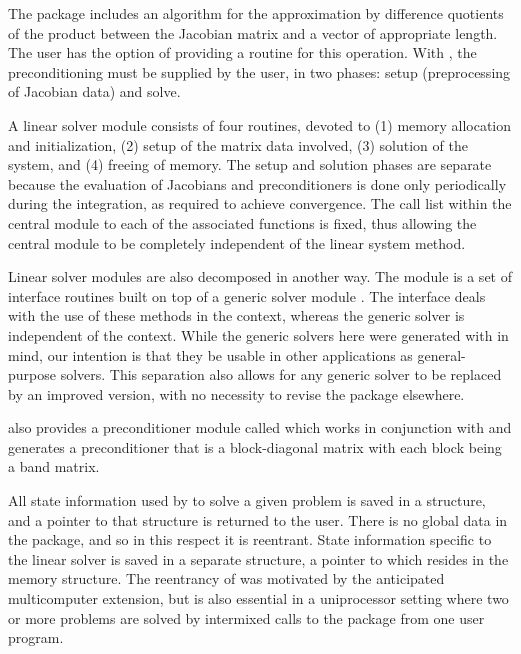 The {\kinspgmr} package includes an algorithm for the approximation
by difference quotients of the product between the Jacobian matrix and
a vector of appropriate length. The user has the option of providing
a routine for this operation.
With  {\kinspgmr},
the preconditioning must be supplied by the user, in two phases:
setup (preprocessing of Jacobian data) and solve.

A {\kinsol} linear solver module consists of four routines, devoted to (1)
memory allocation and initialization, (2) setup of the matrix data
involved, (3) solution of the system, and (4) freeing of memory.
The setup and solution phases are separate because the evaluation of
Jacobians and preconditioners is done only periodically during the
integration, as required to achieve convergence. The call list within
the central {\kinsol} module to each of the associated functions is
fixed, thus allowing the central module to be completely independent
of the linear system method.

Linear solver modules are also decomposed in another way.
The module {\kinspgmr} is a set of
interface routines built on top of a generic solver module {\spgmr}.
The interface deals with the use of these methods in the {\kinsol} context,
whereas the generic solver is independent of the context.
While the generic solvers here were generated with {\sundials} in mind, our
intention is that they be usable in other applications as
general-purpose solvers.  This separation also allows for any generic
solver to be replaced by an improved version, with no necessity to
revise the {\kinsol} package elsewhere.

{\kinsol} also provides a preconditioner module called {\kinbbdpre} which
works in conjunction with {\nvecp} and generates a preconditioner that is
a block-diagonal matrix with each block being a band matrix.

All state information used by {\kinsol} to solve a given problem is saved
in a structure, and a pointer to that structure is returned to the
user.  There is no global data in the {\kinsol} package, and so in this
respect it is reentrant. State information specific to the linear
solver is saved in a separate structure, a pointer to which resides in
the {\kinsol} memory structure. The reentrancy of {\kinsol} was motivated
by the anticipated multicomputer extension, but is also essential
in a uniprocessor setting where two or more problems are solved by
intermixed calls to the package from one user program.
